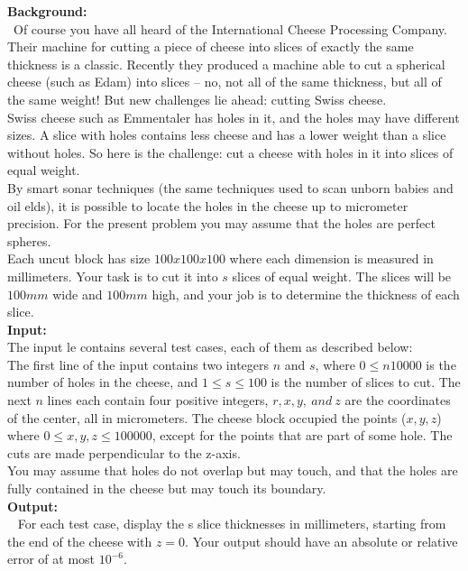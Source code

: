 \documentclass[12pt]{article}
\begin{document}
\noindent \textbf{Background:} \\
~\indent Of course you have all heard of the International Cheese Processing Company. Their machine for cutting a piece
of cheese into slices of exactly the same thickness is a classic. Recently they produced a machine able to cut
a spherical cheese (such as Edam) into slices -- no, not all of the same thickness, but all of the same weight!
But new challenges lie ahead: cutting Swiss cheese. \\
\indent Swiss cheese such as Emmentaler has holes in it, and the holes may have different sizes.  A slice with
holes contains less cheese and has a lower weight than a slice without holes. So here is the challenge: cut a
cheese with holes in it into slices of equal weight. \\
\indent By smart sonar techniques (the same techniques used to scan unborn babies and oil  elds), it is possible
to locate the holes in the cheese up to micrometer precision. For the present problem you may assume that the
holes are perfect spheres. \\
\indent Each uncut block has size $100 x 100 x 100$ where each dimension is measured in millimeters. Your
task is to cut it into $s$ slices of equal weight. The slices will be $100 mm$ wide and $100 mm$ high, and
your job is to determine the thickness of each slice. \\

\noindent \textbf{Input:} \\
The input  le contains several test cases, each of them as described below: \\
\indent The first line of the input contains two integers $n$ and $s$, where $0 \leq n 10000$ is the number of
holes in the cheese, and $1 \leq s \leq 100$ is the number of slices to cut. The next $n$ lines each contain four
positive integers, $r, x, y,\ and\ z$ are the coordinates of the center, all in micrometers. The cheese block
occupied the points ($x, y, z$) where $0 \leq x, y, z \leq 100000$, except for the points that are part of
some hole. The cuts are made perpendicular to the z-axis. \\
\indent You may assume that holes do not overlap but may touch, and that the holes are fully contained
in the cheese but may touch its boundary. \\

\noindent \textbf{Output:} \\
~ \indent For each test case, display the s slice thicknesses in millimeters, starting from the end of the cheese
with $z = 0$. Your output should have an absolute or relative error of at most $10^{-6}$.
\end{document}
